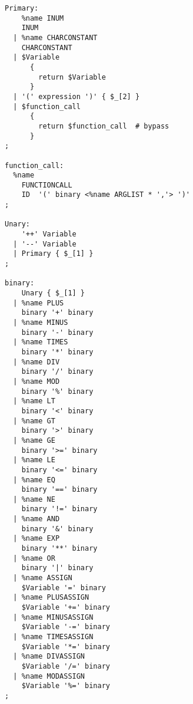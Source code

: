 \begin{verbatim}
Primary:
    %name INUM
    INUM 
  | %name CHARCONSTANT
    CHARCONSTANT
  | $Variable 
      { 
        return $Variable 
      }
  | '(' expression ')' { $_[2] }
  | $function_call 
      { 
        return $function_call  # bypass
      }
;
    
function_call:  
  %name 
    FUNCTIONCALL
    ID  '(' binary <%name ARGLIST * ','> ')'
;

Unary:
    '++' Variable
  | '--' Variable
  | Primary { $_[1] }
;

binary:
    Unary { $_[1] }
  | %name PLUS
    binary '+' binary
  | %name MINUS
    binary '-' binary
  | %name TIMES
    binary '*' binary
  | %name DIV
    binary '/' binary
  | %name MOD
    binary '%' binary
  | %name LT
    binary '<' binary
  | %name GT
    binary '>' binary
  | %name GE
    binary '>=' binary
  | %name LE
    binary '<=' binary
  | %name EQ
    binary '==' binary
  | %name NE
    binary '!=' binary
  | %name AND
    binary '&' binary
  | %name EXP
    binary '**' binary
  | %name OR
    binary '|' binary
  | %name ASSIGN
    $Variable '=' binary
  | %name PLUSASSIGN
    $Variable '+=' binary
  | %name MINUSASSIGN
    $Variable '-=' binary
  | %name TIMESASSIGN
    $Variable '*=' binary
  | %name DIVASSIGN
    $Variable '/=' binary
  | %name MODASSIGN
    $Variable '%=' binary
;
\end{verbatim}


